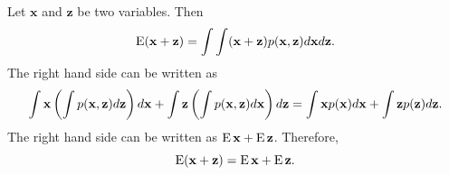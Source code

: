 \subsection{}
\label{2.27}
Let $\mathbf{x}$ and $\mathbf{z}$ be two variables.
Then
%
\begin{equation}
\operatorname{E} (\mathbf{x} + \mathbf{z})
= 
\int 
\int 
(\mathbf{x} + \mathbf{z}) 
p(\mathbf{x}, \mathbf{z}) 
d\mathbf{x} 
d\mathbf{z}.
\end{equation}
%
The right hand side can be written as
%
\begin{equation}
\int 
\mathbf{x} 
\left( 
	\int 
	p(\mathbf{x}, \mathbf{z}) 
	d\mathbf{z} 
\right) 
d\mathbf{x}
+ 
\int 
\mathbf{z} 
\left( 
	\int 
	p(\mathbf{x}, \mathbf{z}) 
	d\mathbf{x} 
\right) 
d\mathbf{z} 
\\
= 
\int 
\mathbf{x} 
p(\mathbf{x}) 
d\mathbf{x}
+ 
\int 
\mathbf{z} 
p(\mathbf{z}) 
d\mathbf{z}.
\end{equation}
%
The right hand side can be written as $\operatorname{E} \mathbf{x} + \operatorname{E} \mathbf{z}$.
Therefore,
%
\begin{equation}
\operatorname{E} (\mathbf{x} + \mathbf{z})
= 
\operatorname{E} \mathbf{x} 
+ 
\operatorname{E} \mathbf{z}.
\end{equation}
%

